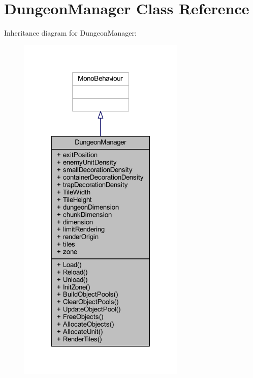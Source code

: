 \hypertarget{class_dungeon_manager}{}\section{Dungeon\+Manager Class Reference}
\label{class_dungeon_manager}


Inheritance diagram for Dungeon\+Manager\+:
\nopagebreak
\begin{figure}[H]
\begin{center}
\leavevmode
\includegraphics[width=225pt]{class_dungeon_manager__inherit__graph}
\end{center}
\end{figure}


